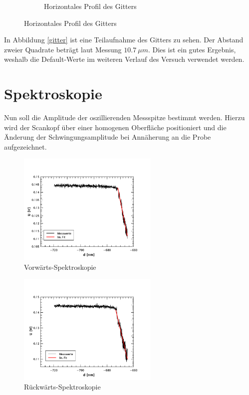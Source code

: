 \begin{figure}
\begin{subfigure}[hb]{0.4\textwidth}
        \caption{Horizontales Profil des Gitters}
    \end{subfigure}
\end{figure}
In Abbildung \ref{gitter} ist eine Teilaufnahme des Gitters zu sehen. Der Abstand 
zweier Quadrate beträgt laut Messung $\SI{10,7}{\mu m}$. Dies ist ein gutes 
Ergebnis, weshalb die Default-Werte im weiteren Verlauf des Versuch verwendet 
werden.

    \section{Spektroskopie}

Nun soll die Amplitude der oszillierenden Messspitze bestimmt werden. Hierzu wird
der Scankopf über einer homogenen Oberfläche positioniert und die Änderung der 
Schwingungsamplitude bei Annäherung an die Probe aufgezeichnet.
\begin{figure}[hp]
    \centering
    \includegraphics[width=0.6\textwidth]{Mess/spek_forw.pdf}
    \caption{Vorwärts-Spektroskopie}
    \label{spek_forw}
\end{figure}
\begin{figure}[hp]
    \centering
    \includegraphics[width=0.6\textwidth]{Mess/spek_backw.pdf}
    \caption{Rückwärts-Spektroskopie}
    \label{spek_backw}
\end{figure}
